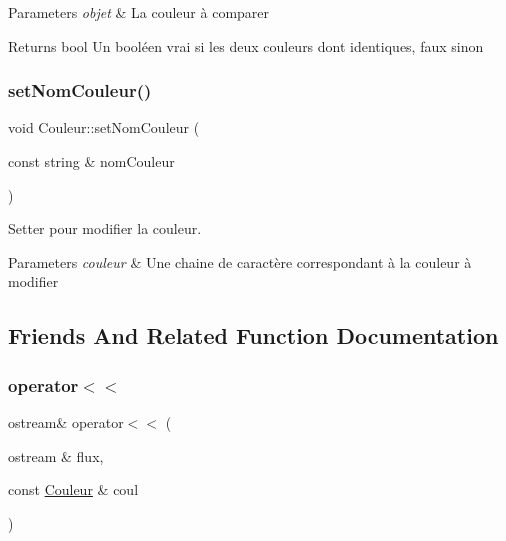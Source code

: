 \begin{DoxyParams}{Parameters}
{\em objet} & La couleur à comparer \\
\hline
\end{DoxyParams}
\begin{DoxyReturn}{Returns}
bool Un booléen vrai si les deux couleurs dont identiques, faux sinon 
\end{DoxyReturn}
\mbox{\label{class_couleur_a571f1d6faacd4ee99f0180400ccb259d}} 
\subsubsection{\texorpdfstring{set\+Nom\+Couleur()}{setNomCouleur()}}
{\footnotesize\ttfamily void Couleur\+::set\+Nom\+Couleur (\begin{DoxyParamCaption}\item[{const string \&}]{nom\+Couleur }\end{DoxyParamCaption})}



Setter pour modifier la couleur. 


\begin{DoxyParams}{Parameters}
{\em couleur} & Une chaine de caractère correspondant à la couleur à modifier \\
\hline
\end{DoxyParams}


\subsection{Friends And Related Function Documentation}
\mbox{\label{class_couleur_a8223b4eee2017fdd318d16692a16c636}} 
\subsubsection{\texorpdfstring{operator$<$$<$}{operator<<}}
{\footnotesize\ttfamily ostream\& operator$<$$<$ (\begin{DoxyParamCaption}\item[{ostream \&}]{flux,  }\item[{const \hyperlink{class_couleur}{Couleur} \&}]{coul }\end{DoxyParamCaption})\hspace{0.3cm}{\ttfamily [friend]}}



